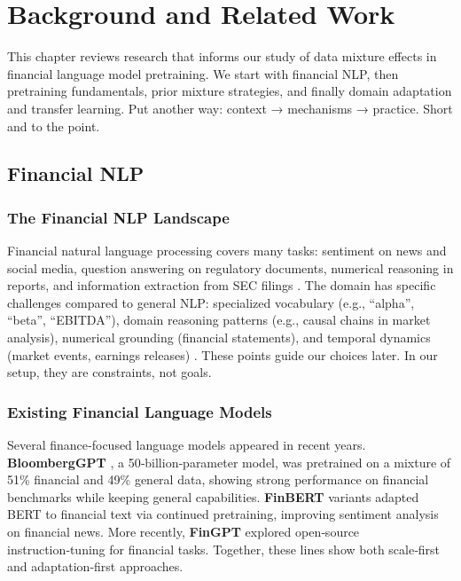 \chapter{Background and Related Work}

This chapter reviews research that informs our study of data mixture effects in financial language model pretraining. We start with financial NLP, then pretraining fundamentals, prior mixture strategies, and finally domain adaptation and transfer learning. Put another way: context → mechanisms → practice. Short and to the point.

\section{Financial NLP}

\subsection{The Financial NLP Landscape}

Financial natural language processing covers many tasks: sentiment on news and social media, question answering on regulatory documents, numerical reasoning in reports, and information extraction from SEC filings \parencite{araci2019finbert, chen2021finqa}. The domain has specific challenges compared to general NLP: specialized vocabulary (e.g., ``alpha'', ``beta'', ``EBITDA''), domain reasoning patterns (e.g., causal chains in market analysis), numerical grounding (financial statements), and temporal dynamics (market events, earnings releases) \parencite{wu2023bloomberggpt, araci2019finbert}. These points guide our choices later. In our setup, they are constraints, not goals.

\subsection{Existing Financial Language Models}

Several finance‑focused language models appeared in recent years. \textbf{BloombergGPT} \parencite{wu2023bloomberggpt}, a 50‑billion‑parameter model, was pretrained on a mixture of 51\% financial and 49\% general data, showing strong performance on financial benchmarks while keeping general capabilities. \textbf{FinBERT} variants \parencite{araci2019finbert, yang2020finbert} adapted BERT to financial text via continued pretraining, improving sentiment analysis on financial news. More recently, \textbf{FinGPT} \parencite{yang2023fingpt} explored open‑source instruction‑tuning for financial tasks. Together, these lines show both scale‑first and adaptation‑first approaches.

